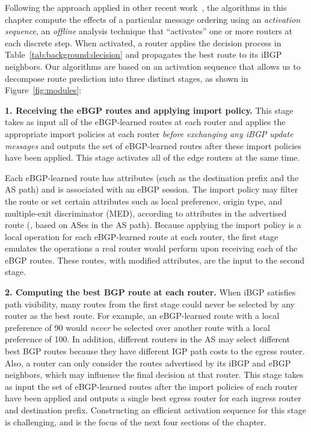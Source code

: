 Following the approach applied in other recent
work~\cite{Feamster2005b,Gao2001a}, the algorithms in this chapter
compute the effects of a particular message ordering using an {\em
activation sequence\/}, an {\em offline} analysis technique that
``activates'' one or more routers at each discrete step.  When
activated, a router applies the decision process in
Table~\ref{tab:background:decision} and propagates the best route to its
iBGP neighbors.  Our algorithms are based on an activation sequence that
allows us to decompose route prediction into three distinct stages, as
shown in Figure~\ref{fig:modules}:

\textbf{1. Receiving the eBGP routes and applying import policy.} This
stage takes as input all of the eBGP-learned routes at each router and
applies the appropriate import policies at each router {\em before
exchanging any iBGP update messages} and outputs the set of eBGP-learned
routes after these import policies have been applied.  This stage
activates all of the edge routers at the same time.  

Each eBGP-learned route has attributes (such as the destination prefix
and the AS path) and is associated with an eBGP session.  The import
policy may filter the route or set certain attributes such as local
preference, origin type, and multiple-exit discriminator (MED),
according to attributes in the advertised route (\eg, based on ASes in
the AS path).  Because applying the import policy is a local operation
for each eBGP-learned route at each router, the first stage emulates the
operations a real router would perform upon receiving each of the eBGP
routes.  These routes, with modified attributes, are the input to the
second stage.

\textbf{2. Computing the best BGP route at each router.}  When iBGP
satisfies path visibility, many routes from the first stage could never
be selected by any router as the best route.  For example, an
eBGP-learned route with a local preference of 90 would {\em never} be
selected over another route with a local preference of 100.  In
addition, different routers in the AS may select different best BGP
routes because they have different IGP path costs to the egress router.
Also, a router can only consider the routes advertised by its iBGP and
eBGP neighbors, which may influence the final decision at that router.
This stage takes as input the set of eBGP-learned routes after the
import policies of each router have been applied and outputs a single
best egress router for each ingress router and destination prefix.
Constructing an efficient activation sequence for this stage is
challenging, and is the focus of the next four sections of the chapter.

